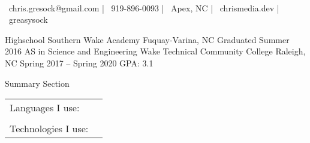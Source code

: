 \documentclass[]{awesome-cv}
\begin{document}
    
\begin{center}
	  \\
	\vspace{2mm}
	{\faEnvelope\ chris.gresock@gmail.com} | {\faMobile\ 919-896-0093} | {\faMapMarker\ Apex, NC} | {\faLink\ chrismedia.dev} | {\faGithub\ greasysock}
\end{center}
\begin{cventries}
	\cventry
	{Highschool}
	{Southern Wake Academy}
	{Fuquay-Varina, NC}
	{Graduated Summer 2016}
	{}
	\cventry
	{AS in Science and Engineering}
	{Wake Technical Community College}
	{Raleigh, NC}
	{Spring 2017 – Spring 2020}
	{GPA: 3.1}
\end{cventries}

\vspace{-2mm}

	Summary Section

\begin{cventries}
	\cventry
	{}
	{\def\arraystretch{1.15}{\begin{tabular}{ l l }
		Languages I use:  & {\skill{ Python (95\%), Ruby (85\%), Go (35\%), Javascript (75\%)}} \\
		\\
		Technologies I use:  & {\skill{ Ruby on Rails (Ruby), React (Javascript),  Redux (Javscript), Sqlalchemy (Python)}} \\
		\end{tabular}}}
	{}
	{}
	{}
\end{cventries}
\end{document}
